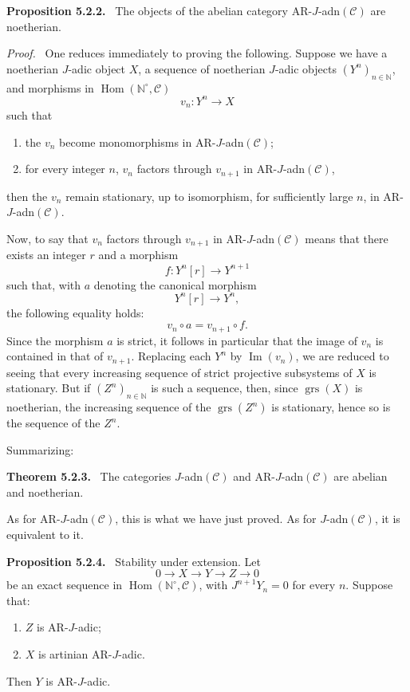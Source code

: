 \documentclass[11pt]{article}
\newenvironment{statement}[1]{\par\medskip\noindent\textbf{#1.}\ }{\par\medskip}
\newenvironment{prooftext}[1][Proof]{\par\noindent\emph{#1.}\ }{\par\medskip}
\DeclareMathOperator{\Hom}{Hom}
\providecommand{\Hom}{\operatorname{Hom}}
\providecommand{\Im}{\operatorname{Im}}
\renewcommand{\Im}{\operatorname{Im}}
\providecommand{\grs}{\operatorname{grs}}
\providecommand{\Im}{\operatorname{Im}}
\begin{document}
\begin{statement}{Proposition 5.2.2}
The objects of the abelian category AR-\(J\)-adn\((\mathcal C)\) are noetherian.
\end{statement}

\begin{prooftext}
One reduces immediately to proving the following. Suppose we have a noetherian \(J\)-adic object \(X\), a sequence of noetherian \(J\)-adic objects \((Y^n)_{n\in\mathbb N}\), and morphisms in \(\Hom(\mathbb N^\circ,\mathcal C)\)
\[
v_n:Y^n\longrightarrow X
\]
such that
\begin{enumerate}[label=\textup{(\roman*)}]
\item the \(v_n\) become monomorphisms in AR-\(J\)-adn\((\mathcal C)\);
\item for every integer \(n\), \(v_n\) factors through \(v_{n+1}\) in AR-\(J\)-adn\((\mathcal C)\),
\end{enumerate}
then the \(v_n\) remain stationary, up to isomorphism, for sufficiently large \(n\), in AR-\(J\)-adn\((\mathcal C)\).

Now, to say that \(v_n\) factors through \(v_{n+1}\) in AR-\(J\)-adn\((\mathcal C)\) means that there exists an integer \(r\) and a morphism
\[
f:Y^n[r]\longrightarrow Y^{n+1}
\]
such that, with \(a\) denoting the canonical morphism
\[
Y^n[r]\longrightarrow Y^n,
\]
the following equality holds:
\[
v_n\circ a=v_{n+1}\circ f .
\]
Since the morphism \(a\) is strict, it follows in particular that the image of \(v_n\) is contained in that of \(v_{n+1}\). Replacing each \(Y^n\) by \(\Im(v_n)\), we are reduced to seeing that every increasing sequence of strict projective subsystems of \(X\) is stationary. But if \((Z^n)_{n\in\mathbb N}\) is such a sequence, then, since \(\grs(X)\) is noetherian, the increasing sequence of the \(\grs(Z^n)\) is stationary, hence so is the sequence of the \(Z^n\).
\end{prooftext}

Summarizing:

\begin{statement}{Theorem 5.2.3}
The categories \(J\)-adn\((\mathcal C)\) and AR-\(J\)-adn\((\mathcal C)\) are abelian and noetherian.
\end{statement}

As for AR-\(J\)-adn\((\mathcal C)\), this is what we have just proved. As for \(J\)-adn\((\mathcal C)\), it is equivalent to it.

\begin{statement}{Proposition 5.2.4}
Stability under extension. Let
\[
0\longrightarrow X\longrightarrow Y\longrightarrow Z\longrightarrow0
\]
be an exact sequence in \(\Hom(\mathbb N^\circ,\mathcal C)\), with \(J^{n+1}Y_n=0\) for every \(n\). Suppose that:
\begin{enumerate}[label=\textup{(\roman*)}]
\item \(Z\) is AR-\(J\)-adic;
\item \(X\) is artinian AR-\(J\)-adic.
\end{enumerate}
Then \(Y\) is AR-\(J\)-adic.
\end{statement}
\end{document}
